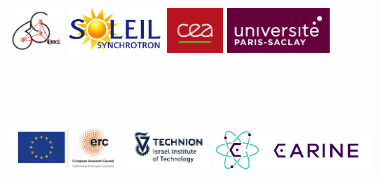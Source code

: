 {
\begin{frame}

    \centering

    \vspace{0.5cm}

    \includegraphics[height=1.2cm]{Figures/logo/logosixs.jpg} \hspace{1cm}
    \colorbox{white}{\includegraphics[height=1.2cm]{Figures/logo/SOLEIL.png}} \hspace{1cm}
    \includegraphics[height=1.2cm]{Figures/logo/CEA.png} \hspace{1cm}
    \includegraphics[height=1.2cm]{Figures/logo/ParisSaclayPrune.jpg}\\
    
    \vspace{2cm}

    \Large{\textcolor{white}{Thank you for listening !}}\\
    \vspace{1cm}
    \small{\textcolor{white}{david.simonne@synchrotron-soleil.fr}}\\
    
    \vspace{2cm}

    \includegraphics[height=1.2cm]{Figures/logo/logo_erc.png}\hspace{1cm}
    \includegraphics[height=1.2cm]{Figures/logo/logo_technion.png}\hspace{1cm}
    \colorbox{white}{\includegraphics[height=1.1cm]{Figures/logo/logocarine.png}}
    
\end{frame}
}